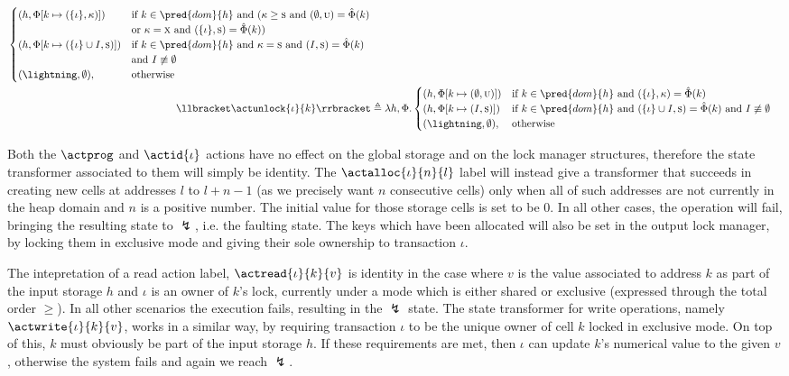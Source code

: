 \begin{defn}
\begin{align*}
\begin{cases}
	(h, \Phi[k \mapsto (\{\iota\}, \kappa)]) & \text{if } k \in \pred{dom}{h} \text{ and } ( \kappa \geq \textsc{s} \text{ and } (\emptyset, \textsc{u}) = \hat{\Phi}(k) \\
	& \text{or } \kappa = \textsc{x} \text{ and } (\{\iota\}, \textsc{s}) = \hat{\Phi}(k) ) \\
	(h, \Phi[k \mapsto (\{\iota\} \cup I, \textsc{s})]) & \text{if } k \in \pred{dom}{h} \text{ and } \kappa = \textsc{s} \text{ and } (I, \textsc{s}) = \hat{\Phi}(k) \\
	& \text{and } I \not\equiv \emptyset \\
	(\lightning, \emptyset), & \text{otherwise}
	\end{cases} \\
	\llbracket \actunlock{\iota}{k} \rrbracket &\triangleq \lambda h, \Phi \ldotp
	\begin{cases}
	(h, \Phi[k \mapsto (\emptyset, \textsc{u})]) & \text{if } k \in \pred{dom}{h} \text{ and } (\{\iota\}, \kappa) = \hat{\Phi}(k) \\
	(h, \Phi[k \mapsto (I, \textsc{s})]) & \text{if } k \in \pred{dom}{h} \text{ and } (\{\iota\} \cup I, \textsc{s}) = \hat{\Phi}(k) \text{ and } I \not\equiv \emptyset \\
	(\lightning, \emptyset), & \text{otherwise}
	\end{cases}
	\end{align*}
\end{defn}
Both the $\actprog$ and $\actid{\iota}$ actions have no effect on the global storage and on the lock manager structures, therefore the state transformer associated to them will simply be identity. The $\actalloc{\iota}{n}{l}$ label will instead give a transformer that succeeds in creating new cells at addresses $l$ to $l + n - 1$ (as we precisely want $n$ consecutive cells) only when all of such addresses are not currently in the heap domain and $n$ is a positive number. The initial value for those storage cells is set to be $0$. In all other cases, the operation will fail, bringing the resulting state to $\lightning$, i.e. the faulting state. The keys which have been allocated will also be set in the output lock manager, by locking them in exclusive mode and giving their sole ownership to transaction $\iota$.

The intepretation of a read action label, $\actread{\iota}{k}{v}$ is identity in the case where $v$ is the value associated to address $k$ as part of the input storage $h$ and $\iota$ is an owner of $k$'s lock, currently under a mode which is either shared or exclusive (expressed through the total order $\geq$). In all other scenarios the execution fails, resulting in the $\lightning$ state. The state transformer for write operations, namely $\actwrite{\iota}{k}{v}$, works in a similar way, by requiring transaction $\iota$ to be the unique owner of cell $k$ locked in exclusive mode. On top of this, $k$ must obviously be part of the input storage $h$. If these requirements are met, then $\iota$ can update $k$'s numerical value to the given $v$, otherwise the system fails and again we reach $\lightning$.

